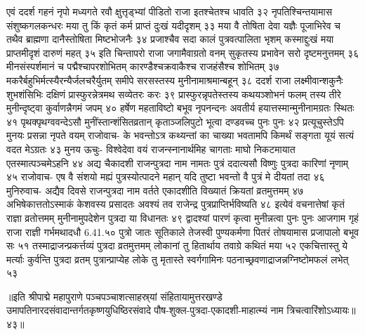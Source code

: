 एवं ददर्श गहनं नृपो मध्यगते रवौ 
क्षुत्तृड्भ्यां पीडितो राजा इतश्चेतश्च धावति ३२
नृपतिश्चिन्तयामास संशुष्कगलकन्धरः 
मया तु किं कृतं कर्म प्राप्तं दुःखं यदीदृशम् ३३
मया वै तोषिता देवा यज्ञैः पूजाभिरेव च 
तथैव ब्राह्मणा दानैस्तोषिता मिष्टभोजनैः ३४
प्रजाश्चैव सदा कालं पुत्रवत्पालिता भृशम् 
कस्माद्दुःखं मया प्राप्तमीदृशं दारुणं महत् ३५
इति चिन्तापरो राजा जगामैवाग्रतो वनम् 
सुकृतस्य प्रभावेन सरो दृष्टमनुत्तमम् ३६
मीनसंस्पर्शमानं च पद्मैश्चापरशोभितम् 
कारण्डैश्चक्रवाकैश्च राजहंसैश्च शोभितम् ३७
मकरैर्बहुभिर्मत्स्यैरन्यैर्जलचरैर्युतम् 
समीपे सरसस्तस्य मुनीनामाश्रमान्बहून् ३८
ददर्श राजा लक्ष्मीवान्शकुनैः शुभशंसिभिः 
दक्षिणं प्रास्फुरन्नेत्रमथ सव्येतरः करः ३९
प्रास्फुरन्नृपतेस्तस्य कथयञ्शोभनं फलम् 
तस्य तीरे मुनीन्दृष्ट्वा कुर्वाणन्नैगमं जपम् ४०
हर्षेण महताविष्टो बभूव नृपनन्दनः 
अवतीर्य हयात्तस्मान्मुनीनामग्रतः स्थितः ४१
पृथक्पृथग्ववन्देऽसौ मुनींस्तान्शंसितव्रतान् 
कृताञ्जलिपुटो भूत्वा दण्डवच्च पुनः पुनः ४२
प्रत्यूचुस्तेऽपि मुनयः प्रसन्ना नृपते वयम् 
राजोवाच-
के भवन्तोऽत्र कथ्यन्तां का चाख्या भवतामपि 
किमर्थं सङ्गता यूयं सत्यं वदत मेऽग्रतः ४३
मुनय ऊचुः-
विश्वेदेवा वयं राजन्स्नानार्थमिह चागताः 
माघो निकटमायात एतस्मात्पञ्चमेऽहनि ४४
अद्य चैकादशी राजन्पुत्रदा नाम नामतः 
पुत्रं ददात्यसौ विष्णुः पुत्रदा कारिणां नृणाम् ४५
राजोवाच-
एष वै संशयो मह्यं पुत्रस्योत्पादने महान् 
यदि तुष्टा भवन्तो वै पुत्रं मे दीयतां तदा ४६
मुनिरुवाच-
अद्यैव दिवसे राजन्पुत्रदा नाम वर्तते 
एकादशीति विख्यातं क्रियतां व्रतमुत्तमम् ४७
अभिषेकात्ततोऽस्माकं केशवस्य प्रसादतः 
अवश्यं तव राजेन्द्र पुत्रप्राप्तिर्भविष्यति ४८
इत्येवं वचनात्तेषां कृतं राज्ञा व्रतोत्तमम् 
मुनीनामुपदेशेन पुत्रदा या विधानतः ४९
द्वादश्यां पारणं कृत्वा मुनीन्नत्वा पुनः पुनः 
आजगाम गृहं राजा राज्ञी गर्भमथादधौ 6.41.५०
पुत्रो जातः सूतिकाले तेजस्वी पुण्यकर्मणा 
पितरं तोषयामास प्रजापालो बभूव सः ५१
तस्माद्राजन्प्रकर्त्तव्यं पुत्रदा व्रतमुत्तमम् 
लोकानां तु हितार्थाय तवाग्रे कथितं मया ५२
एकचित्तास्तु ये मर्त्याः कुर्वन्ति पुत्रदा व्रतम् 
पुत्रान्प्राप्येह लोके तु मृतास्ते स्वर्गगामिनः 
पठनाच्छ्रवणाद्राजन्नग्निष्टोमफलं लभेत् ५३

॥इति श्रीपाद्मे महापुराणे पञ्चपञ्चाशत्साहस्र्यां संहितायामुत्तरखण्डे उमापतिनारदसंवादान्तर्गतकृष्णयुधिष्ठिरसंवादे पौष-शुक्ल-पुत्रदा-एकादशी-माहात्म्यं नाम त्रिचत्वारिंशोऽध्यायः॥४३॥



